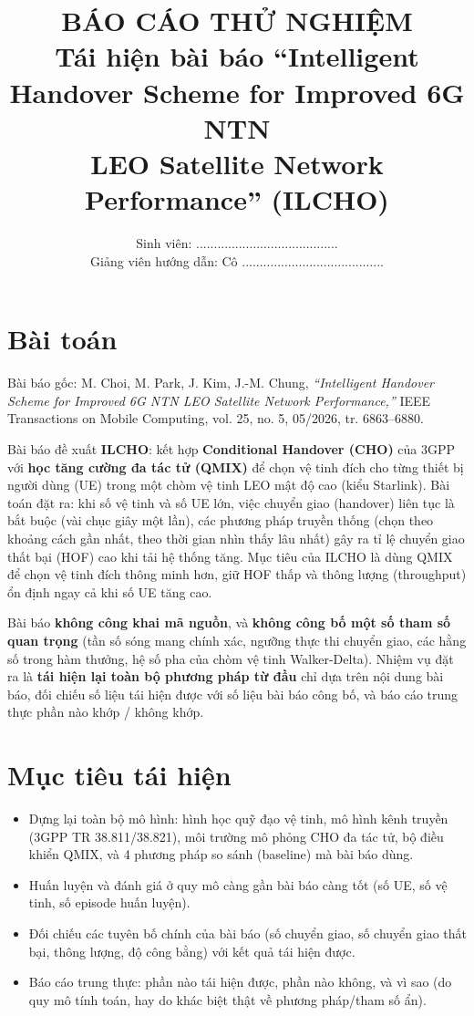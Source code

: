 \documentclass[12pt,a4paper]{article}
\title{\textbf{BÁO CÁO THỬ NGHIỆM}\\[4pt]
\large Tái hiện bài báo ``Intelligent Handover Scheme for Improved 6G NTN\\
LEO Satellite Network Performance'' (ILCHO)}
\author{Sinh viên: ........................................\\
Giảng viên hướng dẫn: Cô ........................................}
\date{}
\begin{document}
\maketitle
\vspace{-2em}

\section{Bài toán}

Bài báo gốc: M. Choi, M. Park, J. Kim, J.-M. Chung, \emph{``Intelligent Handover Scheme for
Improved 6G NTN LEO Satellite Network Performance,''} IEEE Transactions on Mobile Computing,
vol. 25, no. 5, 05/2026, tr. 6863--6880.

Bài báo đề xuất \textbf{ILCHO}: kết hợp \textbf{Conditional Handover (CHO)} của 3GPP với
\textbf{học tăng cường đa tác tử (QMIX)} để chọn vệ tinh đích cho từng thiết bị người dùng
(UE) trong một chòm vệ tinh LEO mật độ cao (kiểu Starlink). Bài toán đặt ra: khi số vệ tinh
và số UE lớn, việc chuyển giao (handover) liên tục là bắt buộc (vài chục giây một lần), các
phương pháp truyền thống (chọn theo khoảng cách gần nhất, theo thời gian nhìn thấy lâu nhất)
gây ra tỉ lệ chuyển giao thất bại (HOF) cao khi tải hệ thống tăng. Mục tiêu của ILCHO là dùng
QMIX để chọn vệ tinh đích thông minh hơn, giữ HOF thấp và thông lượng (throughput) ổn định
ngay cả khi số UE tăng cao.

Bài báo \textbf{không công khai mã nguồn}, và \textbf{không công bố một số tham số quan
trọng} (tần số sóng mang chính xác, ngưỡng thực thi chuyển giao, các hằng số trong hàm
thưởng, hệ số pha của chòm vệ tinh Walker-Delta). Nhiệm vụ đặt ra là \textbf{tái hiện lại
toàn bộ phương pháp từ đầu} chỉ dựa trên nội dung bài báo, đối chiếu số liệu tái hiện được
với số liệu bài báo công bố, và báo cáo trung thực phần nào khớp / không khớp.

\section{Mục tiêu tái hiện}

\begin{itemize}[leftmargin=1.2em]
  \item Dựng lại toàn bộ mô hình: hình học quỹ đạo vệ tinh, mô hình kênh truyền (3GPP TR
        38.811/38.821), môi trường mô phỏng CHO đa tác tử, bộ điều khiển QMIX, và 4 phương
        pháp so sánh (baseline) mà bài báo dùng.
  \item Huấn luyện và đánh giá ở quy mô càng gần bài báo càng tốt (số UE, số vệ tinh, số
        episode huấn luyện).
  \item Đối chiếu các tuyên bố chính của bài báo (số chuyển giao, số chuyển giao thất bại,
        thông lượng, độ công bằng) với kết quả tái hiện được.
  \item Báo cáo trung thực: phần nào tái hiện được, phần nào không, và vì sao (do quy mô tính
        toán, hay do khác biệt thật về phương pháp/tham số ẩn).
\end{itemize}
\end{document}
